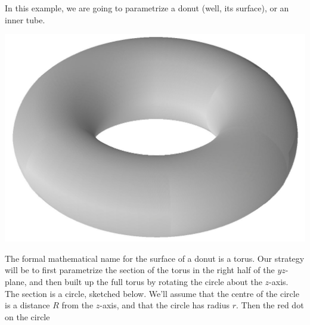 \begin{eg}[Torus]\label{SURdonut}
In this example, we are going to parametrize a donut (well, its surface), or an inner tube.
\begin{nfig}
\begin{center}
    \includegraphics[scale=0.10]{torus3d.jpg}
\end{center}
\end{nfig}
The formal mathematical name for the surface of a donut is a torus. Our strategy will be to first parametrize the section of the torus in the 
right half of the
$yz$-plane,  and then built up the full torus by rotating the circle 
about the $z$-axis. The section is a circle, sketched below.
We'll assume that the centre of the circle is a distance $R$ from the 
$z$-axis, and that the circle has radius $r$. Then the red dot on the circle 

\end{eg}
